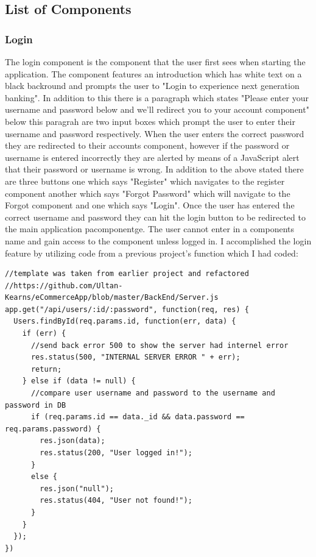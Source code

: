 \subsection{List of Components}
\subsubsection{Login}
The login component is the component that the user first sees when starting the application.  The component features an introduction which has white text on a black backround and prompts the user to "Login to experience next generation banking".  In addition to this there is a paragraph which states "Please enter your username and password below and we'll redirect you to your account component"  below this paragrah are two input boxes which prompt the user to enter their username and password respectively.  When the user enters the correct password they are redirected to their accounts component, however if the password or username is entered incorrectly they are alerted by means of a JavaScript alert that their password or username is wrong.  In addition to the above stated there are three buttons one which says "Register" which navigates to the register component another which says "Forgot Password" which will navigate to the Forgot component and one which says "Login".  Once the user has entered the correct username and password they can hit the login button to be redirected to the main application pacomponentge.  The user cannot enter in a components name and gain access to the component unless logged in.  I accomplished the login feature by utilizing code from a previous project's function which I had coded:
\begin{verbatim}
//template was taken from earlier project and refactored
//https://github.com/Ultan-Kearns/eCommerceApp/blob/master/BackEnd/Server.js
app.get("/api/users/:id/:password", function(req, res) {
  Users.findById(req.params.id, function(err, data) {
    if (err) {
      //send back error 500 to show the server had internel error
      res.status(500, "INTERNAL SERVER ERROR " + err);
      return;
    } else if (data != null) {
      //compare user username and password to the username and password in DB
      if (req.params.id == data._id && data.password == req.params.password) {
        res.json(data);
        res.status(200, "User logged in!");
      }
      else {
        res.json("null");
        res.status(404, "User not found!");
      }
    }
  });
})
\end{verbatim}
